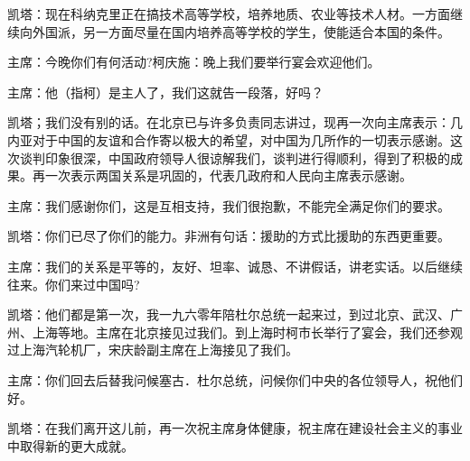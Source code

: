 凯塔：现在科纳克里正在搞技术高等学校，培养地质、农业等技术人材。一方面继续向外国派，另一方面尽量在国内培养高等学校的学生，使能适合本国的条件。

主席：今晚你们有何活动?柯庆施：晚上我们要举行宴会欢迎他们。

主席：他（指柯）是主人了，我们这就告一段落，好吗？

凯塔；我们没有别的话。在北京已与许多负责同志讲过，现再一次向主席表示：几内亚对于中国的友谊和合作寄以极大的希望，对中国为几所作的一切表示感谢。这次谈判印象很深，中国政府领导人很谅解我们，谈判进行得顺利，得到了积极的成果。再一次表示两国关系是巩固的，代表几政府和人民向主席表示感谢。

主席：我们感谢你们，这是互相支持，我们很抱歉，不能完全满足你们的要求。

凯塔：你们已尽了你们的能力。非洲有句话：援助的方式比援助的东西更重要。

主席：我们的关系是平等的，友好、坦率、诚恳、不讲假话，讲老实话。以后继续往来。你们来过中国吗?

凯塔：他们都是第一次，我一九六零年陪杜尔总统一起来过，到过北京、武汉、广州、上海等地。主席在北京接见过我们。到上海时柯市长举行了宴会，我们还参观过上海汽轮机厂，宋庆龄副主席在上海接见了我们。

主席：你们回去后替我问候塞古．杜尔总统，问候你们中央的各位领导人，祝他们好。

凯塔：在我们离开这儿前，再一次祝主席身体健康，祝主席在建设社会主义的事业中取得新的更大成就。


